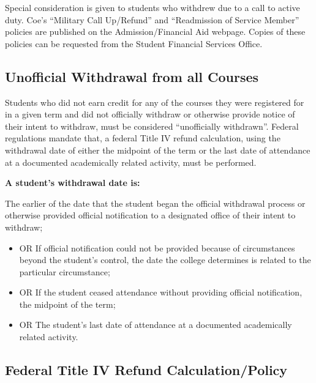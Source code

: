 \documentclass[
  letterpaper,
]{scrbook}
\providecommand{\tightlist}{%
  \setlength{\itemsep}{0pt}\setlength{\parskip}{0pt}}
\begin{document}
Special consideration is given to students who withdrew due to a call to
active duty. Coe's ``Military Call Up/Refund'' and ``Readmission of
Service Member'' policies are published on the Admission/Financial Aid
webpage. Copies of these policies can be requested from the Student
Financial Services Office.

\subsection{Unofficial Withdrawal from all
Courses}\label{unofficial-withdrawal-from-all-courses}

Students who did not earn credit for any of the courses they were
registered for in a given term and did not officially withdraw or
otherwise provide notice of their intent to withdraw, must be considered
``unofficially withdrawn''. Federal regulations mandate that, a federal
Title IV refund calculation, using the withdrawal date of either the
midpoint of the term or the last date of attendance at a documented
academically related activity, must be performed.

\textbf{A student's withdrawal date is:}

The earlier of the date that the student began the official withdrawal
process or otherwise provided official notification to a designated
office of their intent to withdraw;

\begin{itemize}
\tightlist
\item
  OR If official notification could not be provided because of
  circumstances beyond the student's control, the date the college
  determines is related to the particular circumstance;
\item
  OR If the student ceased attendance without providing official
  notification, the midpoint of the term;
\item
  OR The student's last date of attendance at a documented academically
  related activity.
\end{itemize}

\subsection{Federal Title IV Refund
Calculation/Policy}\label{sec-federal-title-IV-refund-calculation-policy}
\end{document}
